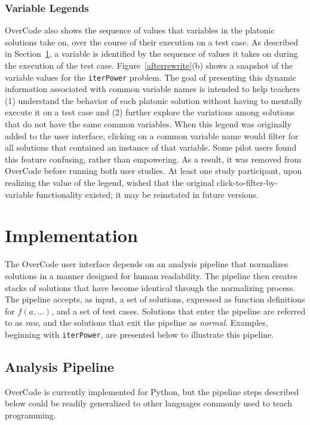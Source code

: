 \documentclass[12pt,twoside]{mitthesis}
\newcommand \codevar[1]{\texttt{#1}}
\begin{document}
\subsubsection{Variable Legends} OverCode also shows the sequence of values that variables in the platonic solutions take on, over the course of their execution on a test case. As described in Section~\ref{pipeline}, a variable is identified by the sequence of values it takes on during the execution of the test case. Figure~\ref{afterrewrite}(b) shows a snapshot of the variable values for the \codevar{iterPower} problem. The goal of presenting this dynamic information associated with common variable names is intended to help teachers (1) understand the behavior of each platonic solution without having to mentally execute it on a test case and (2) further explore the variations among solutions that do not have the same common variables. When this legend was originally added to the user interface, clicking on a common variable name would filter for all solutions that contained an instance of that variable. Some pilot users found this feature confusing, rather than empowering. As a result, it was removed from OverCode before running both user studies. At least one study participant, upon realizing the value of the legend, wished that the original click-to-filter-by-variable functionality existed; it may be reinstated in future versions.

\section{Implementation} \label{pipeline}
The OverCode user interface depends on an analysis pipeline that normalizes solutions in a manner designed for human readability. The pipeline then creates stacks of solutions that have become identical through the normalizing process. The pipeline accepts, as input, a set of solutions, expressed as function definitions for $f(a,...)$, and a set of test cases. Solutions that enter the pipeline are referred to as \emph{raw}, and the solutions that exit the pipeline as \emph{normal}. Examples, beginning with \codevar{iterPower}, are presented below to illustrate this pipeline.

\subsection{Analysis Pipeline}
OverCode is currently implemented for Python, but the pipeline steps described below could be readily generalized to other languages commonly used to teach programming.
\end{document}
